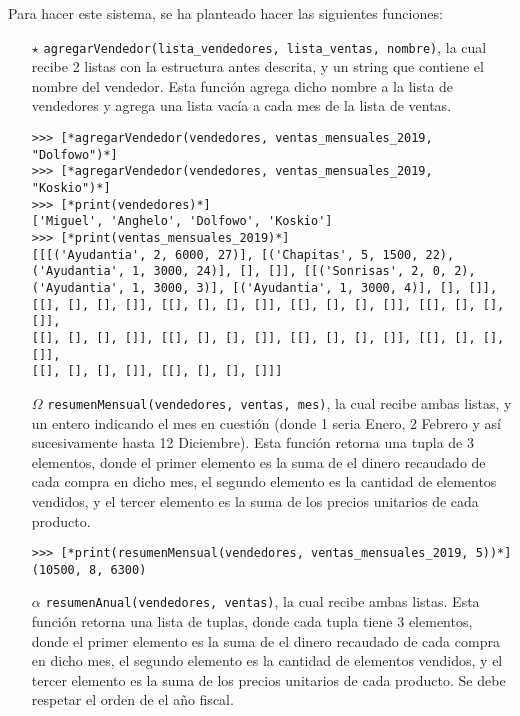 Para hacer este sistema, se ha planteado hacer las siguientes funciones:
\begin{enumerate}
    \item[$\star$] \texttt{agregarVendedor(lista\_vendedores, lista\_ventas, nombre)}, la cual recibe 2 listas con la estructura antes descrita, y un string que contiene el nombre del vendedor. Esta función agrega dicho nombre a la lista de vendedores y agrega una lista vacía a cada mes de la lista de ventas.

\begin{lstlisting}[style=consola]
>>> [*agregarVendedor(vendedores, ventas_mensuales_2019, "Dolfowo")*]
>>> [*agregarVendedor(vendedores, ventas_mensuales_2019, "Koskio")*]
>>> [*print(vendedores)*]
['Miguel', 'Anghelo', 'Dolfowo', 'Koskio']
>>> [*print(ventas_mensuales_2019)*]
[[[('Ayudantia', 2, 6000, 27)], [('Chapitas', 5, 1500, 22), 
('Ayudantia', 1, 3000, 24)], [], []], [[('Sonrisas', 2, 0, 2), 
('Ayudantia', 1, 3000, 3)], [('Ayudantia', 1, 3000, 4)], [], []], 
[[], [], [], []], [[], [], [], []], [[], [], [], []], [[], [], [], []], 
[[], [], [], []], [[], [], [], []], [[], [], [], []], [[], [], [], []],
[[], [], [], []], [[], [], [], []]]
\end{lstlisting}

    
    \item[$\Omega$] \texttt{resumenMensual(vendedores, ventas, mes)}, la cual recibe ambas listas, y un entero indicando el mes en cuestión (donde 1 seria Enero, 2 Febrero y así sucesivamente hasta 12 Diciembre). Esta función retorna una tupla de 3 elementos, donde el primer elemento es la suma de el dinero recaudado de cada compra en dicho mes, el segundo elemento es la cantidad de elementos vendidos, y el tercer elemento es la suma de los precios unitarios de cada producto.

\begin{lstlisting}[style=consola]
>>> [*print(resumenMensual(vendedores, ventas_mensuales_2019, 5))*]
(10500, 8, 6300)
\end{lstlisting}
    
    \item[$\alpha$] \texttt{resumenAnual(vendedores, ventas)}, la cual recibe ambas listas. Esta función retorna una lista de tuplas, donde cada tupla tiene 3 elementos, donde el primer elemento es la suma de el dinero recaudado de cada compra en dicho mes, el segundo elemento es la cantidad de elementos vendidos, y el tercer elemento es la suma de los precios unitarios de cada producto. Se debe respetar el orden de el año fiscal.
    

\end{enumerate}
